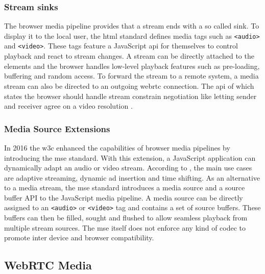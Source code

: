 \subsubsection{Stream sinks}

The browser media pipeline provides that a stream ends with a so called sink. To display it to the local user, the \gls{html} standard \cite[\S4.7]{html-w3c} defines media tags such as \lstinline|<audio>| and \lstinline|<video>|. These tags feature a JavaScript \gls{api} for themselves to control playback and react to stream changes. A stream can be directly attached to the elements and the browser handles low-level playback features such as pre-loading, buffering and random access. To forward the stream to a remote system, a media stream can also be directed to an outgoing \gls{webrtc} connection. The \gls{api} of which states the browser should handle stream constrain negotiation like letting sender and receiver agree on a video resolution \cite[\S5.1]{webrtc-w3c}.

\subsubsection{Media Source Extensions}

In 2016 the \gls{w3c} enhanced the capabilities of browser media pipelines by introducing the \gls{mse} standard. With this extension, a JavaScript application can dynamically adapt an audio or video stream. According to \cite{mse-google}, the main use cases are adaptive streaming, dynamic ad insertion and time shifting. As an alternative to a media stream, the \gls{mse} standard introduces a media source and a source buffer API to the JavaScript media pipeline. A media source can be directly assigned to an \lstinline|<audio>| or \lstinline|<video>| tag and contains a set of source buffers. These buffers can then be filled, sought and flushed to allow seamless playback from multiple stream sources. The \gls{mse} itself does not enforce any kind of codec to promote inter device and browser compatibility.


\subsection{WebRTC Media}
\label{subsec:webrtc-media}

